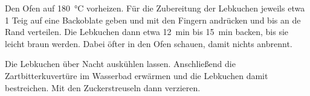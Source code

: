 \begin{recipe}
{        \step Den Ofen auf \SI{180}{\celsius} vorheizen. Für die Zubereitung der Lebkuchen jeweils etwa \SI{1}{\TL} Teig auf eine Backoblate geben und mit den Fingern andrücken und bis an de Rand verteilen. Die Lebkuchen dann etwa \SI{12}{\minute} bis \SI{15}{\minute} backen, bis sie leicht braun werden. Dabei öfter in den Ofen schauen, damit nichts anbrennt.

        \step Die Lebkuchen über Nacht auskühlen lassen. Anschließend die Zartbitterkuvertüre im Wasserbad erwärmen und die Lebkuchen damit bestreichen. Mit den Zuckerstreuseln dann verzieren.
    }



\end{recipe}
